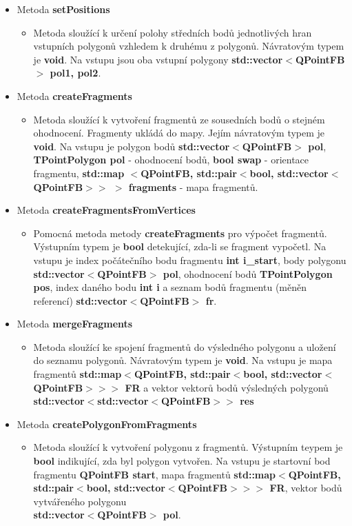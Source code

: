 \documentclass[a4paper, 12pt]{article}
\begin{document}
\begin{itemize}
\begin{itemize}
		\end{itemize}
	\item Metoda \textbf{setPositions}
		\begin{itemize}
			\item Metoda sloužící k určení polohy středních bodů jednotlivých hran vstupních polygonů vzhledem k druhému z polygonů. Návratovým typem je \textbf{void}. Na vstupu jsou oba vstupní polygony \textbf{std::vector$<$QPointFB$>$ pol1, pol2}.
		\end{itemize}
	\item Metoda \textbf{createFragments}
		\begin{itemize}
			\item Metoda sloužící k vytvoření fragmentů ze sousedních bodů o stejném ohodnocení. Fragmenty ukládá do mapy. Jejím návratovým typem je \textbf{void}. Na vstupu je 	polygon bodů \textbf{std::vector$<$QPointFB$>$ pol}, \textbf{TPointPolygon pol} - ohodnocení bodů, \textbf{bool swap} - orientace fragmentu, \textbf{std::map $<$QPointFB, std::pair$<$bool,  std::vector$<$QPointFB$> >$ $>$ fragments} - mapa fragmentů.
		\end{itemize}
	\item Metoda \textbf{createFragmentsFromVertices}
		\begin{itemize}
			\item Pomocná metoda metody \textbf{createFragments} pro výpočet fragmentů. Výstupním typem je \textbf{bool} detekující, zda-li se fragment vypočetl. Na vstupu je index počátečního bodu fragmentu \textbf{int i\_start}, body polygonu \textbf{std::vector$<$QPointFB$>$ pol}, ohodnocení bodů \textbf{TPointPolygon pos}, index daného bodu \textbf{int i} a seznam bodů fragmentu (měněn referencí) \textbf{std::vector$<$QPointFB$>$ fr}.
		\end{itemize}
	\item Metoda \textbf{mergeFragments}
		\begin{itemize}
			\item Metoda sloužící ke spojení fragmentů do výsledného polygonu a uložení do seznamu polygonů. Návratovým typem je \textbf{void}. Na vstupu je mapa fragmentů \textbf{std::map$<$QPointFB, std::pair$<$bool, std::vector$<$QPointFB$> > >$ FR} a vektor vektorů bodů výsledných polygonů \textbf{std::vector$<$std::vector$<$QPointFB$> >$ res}
		\end{itemize}
	\item Metoda \textbf{createPolygonFromFragments}
		\begin{itemize}
			\item Metoda sloužící k vytvoření polygonu z fragmentů. Výstupním teypem je \textbf{bool} indikující, zda byl polygon vytvořen. Na vstupu je startovní bod fragmentu \textbf{QPointFB start}, mapa fragmentů \textbf{std::map$<$QPointFB, std::pair$<$bool, std::vector$<$QPointFB$> > >$ FR}, vektor bodů vytvářeného polygonu \\ \textbf{std::vector$<$QPointFB$>$ pol}.

\end{itemize}
\end{itemize}
\end{document}
